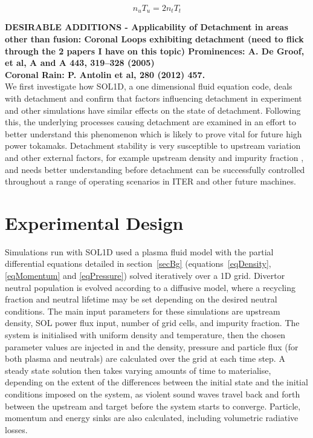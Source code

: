 \documentclass[12pt]{article}  %
\begin{document}
  \begin{equation}\label{eqPus_tg}
  n_uT_u = 2n_tT_t
  \end{equation}

\textbf{DESIRABLE ADDITIONS - Applicability of Detachment in areas other than fusion: Coronal Loops exhibiting detachment (need to flick through the 2 papers I have on this topic) 
Prominences: A. De Groof, et al, A and A 443, 319–328 (2005)}\\

\textbf{Coronal Rain: P. Antolin et al, 280 (2012) 457.}\\


We first investigate how SOL1D, a one dimensional fluid equation code, deals with detachment and confirm that factors influencing detachment in experiment and other simulations have similar effects on the state of detachment. Following this, the underlying processes causing detachment are examined in an effort to better understand this phenomenon which is likely to prove vital for future high power tokamaks. Detachment stability is very susceptible to upstream variation and other external factors, for example upstream density and impurity fraction \cite{Lipschultz2016}, and needs better understanding before detachment can be successfully controlled throughout a range of operating scenarios in ITER and other future machines. 


\section{Experimental Design}\label{secExpt}
Simulations run with SOL1D used a plasma fluid model with the partial differential equations detailed in section~\ref{secBg} (equations~\ref{eqDensity}, \ref{eqMomentum} and \ref{eqPressure}) solved iteratively over a 1D grid. Divertor neutral population is evolved according to a diffusive model, where a recycling fraction and neutral lifetime may be set depending on the desired neutral conditions. The main input parameters for these simulations are upstream density, SOL power flux input, number of grid cells, and impurity fraction. The system is initialised with uniform density and temperature, then the chosen parameter values are injected in and the density, pressure and particle flux (for both plasma and neutrals) are calculated over the grid at each time step. A steady state solution then takes varying amounts of time to materialise, depending on the extent of the differences between the initial state and the initial conditions imposed on the system, as violent sound waves travel back and forth between the upstream and target before the system starts to converge. Particle, momentum and energy sinks are also calculated, including volumetric radiative losses.
\end{document}
